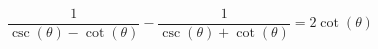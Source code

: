 {$\dfrac{1}{\csc(\theta)-\cot(\theta)} - \dfrac{1}{\csc(\theta) + \cot(\theta)} = 2 \cot(\theta)$}
{}
